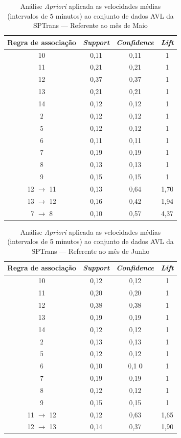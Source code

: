 \documentclass[
	12pt,				%
	oneside,			%
	a4paper,			%
	english,			%
	brazil				%
	]{abntex2ppgsi}
\begin{document}
{{\begin{apendicesenv}
\begin{table}[!htb]
\centering
\caption {Análise \textit{Apriori} aplicada as velocidades médias (intervalos de 5 minutos) ao conjunto de dados AVL da SPTrans --- Referente ao mês de Maio}
\label {tab:aprioriMay}
\begin{tabular}{c|c|c|c}
\toprule
\textbf{Regra de associação} & \textit{\textbf{Support}} & \textit{\textbf{Confidence}} & \textit{\textbf{Lift}} \\
\midrule
10 &  0,11 &  0,11 &  1\\
\hline
11 &  0,21 &  0,21 &  1\\
\hline
12 &  0,37 &  0,37 &  1\\
\hline
13 &  0,21 &  0,21 &  1\\
\hline
14 &  0,12 &  0,12 &  1\\
\hline
2 &  0,12 &  0,12 &  1\\
\hline
5 &  0,12 &  0,12 &  1\\
\hline
6 &  0,11 &  0,11 &  1\\
\hline
7 &  0,19 &  0,19 &  1\\
\hline
8 &  0,13 &  0,13 &  1\\
\hline
9 &  0,15 &  0,15 &  1\\
\hline
12 $\rightarrow$ 11 &  0,13 &  0,64 &  1,70\\
\hline
13 $\rightarrow$ 12 &  0,16 &  0,42 &  1,94\\
\hline
7 $\rightarrow$ 8 &  0,10 &  0,57 &  4,37\\
\bottomrule
\end{tabular}
\end{table}

\begin{table}[!htb]
\centering
\caption {Análise \textit{Apriori} aplicada as velocidades médias (intervalos de 5 minutos) ao conjunto de dados AVL da SPTrans --- Referente ao mês de Junho}
\label {tab:aprioriJune}
\begin{tabular}{c|c|c|c}
\toprule
\textbf{Regra de associação} & \textit{\textbf{Support}} & \textit{\textbf{Confidence}} & \textit{\textbf{Lift}} \\
\midrule
10 &  0,12 &  0,12 &  1\\
\hline
11 &  0,20 &  0,20 &  1\\
\hline
12 &  0,38 &  0,38 &  1\\
\hline
13 &  0,19 &  0,19 &  1\\
\hline
14 &  0,12 &  0,12 &  1\\
\hline
2 &  0,13 &  0,13 &  1\\
\hline
5 &  0,12 &  0,12 &  1\\
\hline
6 &  0,10 &  0,1 0&  1\\
\hline
7 &  0,19 &  0,19 &  1\\
\hline
8 &  0,12 &  0,12 &  1\\
\hline
9 &  0,15 &  0,15 &  1\\
\hline
11 $\rightarrow$ 12 &  0,12 &  0,63 &  1,65\\
\hline
12 $\rightarrow$ 13 &  0,14 &  0,37 &  1,90\\
\bottomrule
\end{tabular}
\end{table}


\end{apendicesenv}}}
\end{document}

